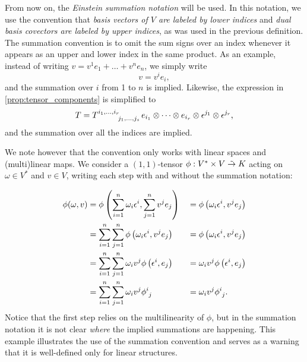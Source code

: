 From now on, the \emph{Einstein summation notation} will be used. In this notation, we use the convention that \emph{basis vectors of \(V\) are labeled by lower indices} and \emph{dual basis covectors are labeled by upper indices}, as was used in the previous definition. The summation convention is to omit the sum signs over an index whenever it appears as an upper and lower index in the same product. As an example, instead of writing \(v = v^1e_1 + \dots + v^n e_n\), we simply write
\begin{equation*}
    v = v^i e_i,
\end{equation*}
and the summation over \(i\) from 1 to \(n\) is implied. Likewise, the expression in \cref{prop:tensor_components} is simplified to
\begin{equation*}
    T = T\indices{^{i_1, \dots, i_r}_{j_1, \dots, j_s}} e_{i_1} \otimes \dots \otimes e_{i_r} \otimes \epsilon^{j_1} \otimes \epsilon^{j_r},
\end{equation*}
and the summation over all the indices are implied.

We note however that the convention only works with linear spaces and (multi)linear maps. We consider a \((1,1)\)-tensor \(\phi : V ^{\ast} \times V \mathrel{\tilde{\to}} K\) acting on \(\omega \in V ^{\ast}\) and \(v \in V\), writing each step with and without the summation notation:

\begin{equation*}
    \begin{aligned}
        \phi(\omega, v) &= \phi \left(\sum_{i = 1}^n \omega_i \epsilon^i, \sum_{j = 1}^n v^j e_j\right)&&= \phi\left(\omega_i\epsilon^i, v^j e_j\right)\\
                        &= \sum_{i=1}^n\sum_{j=1}^n \phi\left(\omega_i \epsilon^i, v^je_j\right) &&= \phi\left(\omega_i\epsilon^i, v^j e_j\right)\\
                        &= \sum_{i=1}^n \sum_{j=1}^n \omega_i v^j \phi\left(\epsilon^i, e_j\right)&&=\omega_i v^j \phi\left(\epsilon^i, e_j\right)\\
                        &= \sum_{i=1}^n \sum_{j=1}^n \omega_i v^j \phi\indices{^i_j} &&=\omega_i v^j \phi\indices{^i_j}.
    \end{aligned}
\end{equation*}
Notice that the first step relies on the multilinearity of \(\phi\), but in the summation notation it is not clear \emph{where} the implied summations are happening. This example illustrates the use of the summation convention and serves as a warning that it is well-defined only for linear structures.

